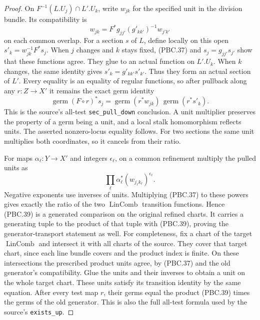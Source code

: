 \begin{proof}
On $F^{-1}(L.U_j)\cap L'.U_k$, write $w_{jk}$ for the
specified unit in the division bundle.  Its compatibility is
\[
 w_{jk}=F^*g_{jj'}(g'_{kk'})^{-1}w_{j'k'}
                                                        \tag{PBC.37}
\]
on each common overlap.  For a section $s$ of $L$, define
locally on this open
$s'_k=w_{jk}^{-1}F^*s_j$.
When $j$ changes and $k$ stays fixed, (PBC.37) and
$s_j=g_{jj'}s_{j'}$ show that these functions agree.
They glue to an actual function on $L'.U_k$.
When $k$ changes, the same identity gives
$s'_k=g'_{kk'}s'_{k'}$.
Thus they form an actual section of $L'$.
Every equality is an equality of regular functions, so after
pullback along any $r:Z\to X'$ it remains the exact germ
identity
\[
 \operatorname{germ}(F\circ r)^*s_j
    =\operatorname{germ}(r^*w_{jk})\,
                      \operatorname{germ}(r^*s'_k).
                                                        \tag{PBC.38}
\]
This is the source's all-test \texttt{sec\_pull\_down}
conclusion.  A unit multiplier preserves the property of a
germ being a unit, and a local stalk homomorphism reflects
units.  The asserted nonzero-locus equality follows.
For two sections the same unit multiplies both coordinates,
so it cancels from their ratio.

For maps $\alpha_\ell:Y\to X'$ and integers $\epsilon_\ell$,
on a common refinement multiply the pulled units as
\[
 \prod_\ell \alpha_\ell^*(w_{j_\ell k_\ell})^{\epsilon_\ell}.
                                                        \tag{PBC.39}
\]
Negative exponents use inverses of units.
Multiplying (PBC.37) to these powers gives exactly the ratio
of the two $\operatorname{LinComb}$ transition functions.
Hence (PBC.39) is a generated comparison on the original
refined charts.  It carries a generating tuple to the
product of that tuple with (PBC.39), proving the
generator-transport statement as well.
For completeness, fix a chart of the target
$\operatorname{LinComb}$ and intersect it with all charts
of the source.  They cover that target chart, since each
line bundle covers and the product index is finite.
On these intersections the prescribed product units agree,
by (PBC.37) and the old generator's compatibility.
Glue the units and their inverses to obtain a unit on the
whole target chart.  These units satisfy its transition
identity by the same equation.  After every test map $r$,
their germs equal the product (PBC.39) times the germs of
the old generator.  This is also the full all-test formula
used by the source's \texttt{exists\_up}.


\end{proof}
